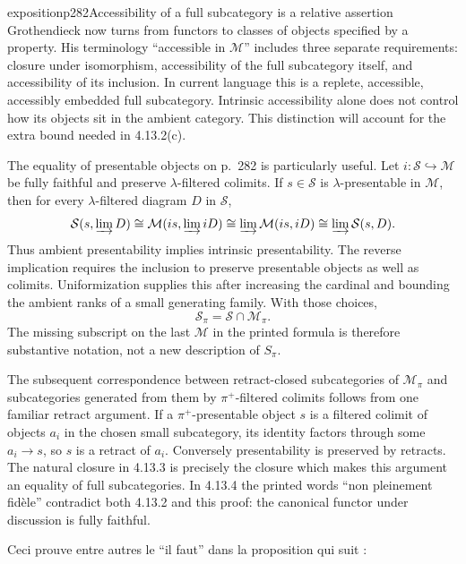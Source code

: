 \begin{dcomment}{exposition}{p282}{Accessibility of a full subcategory is a relative assertion}
Grothendieck now turns from functors to classes of objects specified by a property. His terminology ``accessible in $\mathcal M$'' includes three separate requirements: closure under isomorphism, accessibility of the full subcategory itself, and accessibility of its inclusion. In current language this is a replete, accessible, accessibly embedded full subcategory. Intrinsic accessibility alone does not control how its objects sit in the ambient category. This distinction will account for the extra bound needed in 4.13.2(c).

The equality of presentable objects on p.~282 is particularly useful. Let $i:\mathcal S\hookrightarrow\mathcal M$ be fully faithful and preserve $\lambda$-filtered colimits. If $s\in\mathcal S$ is $\lambda$-presentable in $\mathcal M$, then for every $\lambda$-filtered diagram $D$ in $\mathcal S$,
\[
 \mathcal S(s,\varinjlim D)
 \cong\mathcal M(is,\varinjlim iD)
 \cong\varinjlim\mathcal M(is,iD)
 \cong\varinjlim\mathcal S(s,D).
\]
Thus ambient presentability implies intrinsic presentability. The reverse implication requires the inclusion to preserve presentable objects as well as colimits. Uniformization supplies this after increasing the cardinal and bounding the ambient ranks of a small generating family. With those choices,
\[
 \mathcal S_\pi=\mathcal S\cap\mathcal M_\pi.
\]
The missing subscript on the last $\mathcal M$ in the printed formula is therefore substantive notation, not a new description of $S_\pi$.

The subsequent correspondence between retract-closed subcategories of $\mathcal M_\pi$ and subcategories generated from them by $\pi^+$-filtered colimits follows from one familiar retract argument. If a $\pi^+$-presentable object $s$ is a filtered colimit of objects $a_i$ in the chosen small subcategory, its identity factors through some $a_i\to s$, so $s$ is a retract of $a_i$. Conversely presentability is preserved by retracts. The natural closure in 4.13.3 is precisely the closure which makes this argument an equality of full subcategories. In 4.13.4 the printed words ``non pleinement fid\`ele'' contradict both 4.13.2 and this proof: the canonical functor under discussion is fully faithful.
\end{dcomment}


Ceci prouve entre autres le “il faut” dans la proposition qui suit :

